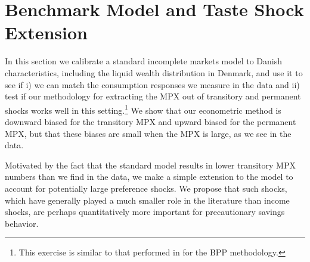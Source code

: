 \documentclass[titlepage]{\econtex}\newcommand{\texname}{ConsumptionHeterogeneity}
\begin{document}
\section{Benchmark Model and Taste Shock Extension} \label{model}
In this section we calibrate a standard incomplete markets model to Danish characteristics, including the liquid wealth distribution in Denmark, and use it to see if i) we can match the consumption responses we measure in the data and ii) test if our methodology for extracting the MPX out of transitory and permanent shocks works well in this setting.\footnote{This exercise is similar to that performed in \cite{kaplan_how_2010} for the BPP methodology.} We show that our econometric method is downward biased for the transitory MPX and upward biased for the permanent MPX, but that these biases are small when the MPX is large, as we see in the data.

Motivated by the fact that the standard model results in lower transitory MPX numbers than we find in the data, we make a simple extension to the model to account for potentially large preference shocks. We propose that such shocks, which have generally played a much smaller role in the literature than income shocks, are perhaps quantitatively more important for precautionary savings behavior.
\end{document}
